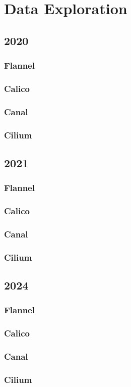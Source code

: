 %
%

\pagebreak
\section{Data Exploration}

\onehalfspacing

\subsection{2020}

\subsubsection{Flannel}

\subsubsection{Calico}

\subsubsection{Canal}

\subsubsection{Cilium}

\subsection{2021}

\subsubsection{Flannel}

\subsubsection{Calico}

\subsubsection{Canal}

\subsubsection{Cilium}

\subsection{2024}

\subsubsection{Flannel}

\subsubsection{Calico}

\subsubsection{Canal}

\subsubsection{Cilium}
